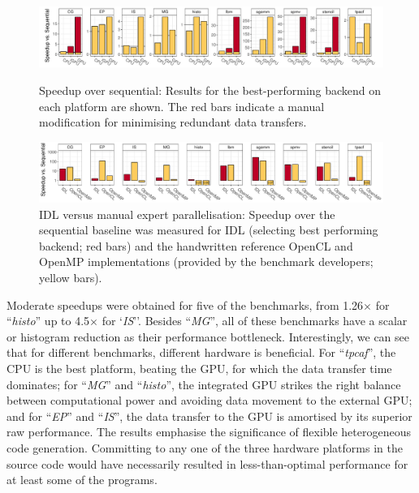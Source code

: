 \begin{figure}[t]
  \centering
  \includegraphics[width=\textwidth]{figures/asplosplots/speedup_vs_sequential_wide.pdf}
  \caption{Speedup over sequential:
           Results for the best-performing backend on each platform are shown.
           The red bars indicate a manual modification for minimising redundant
           data transfers.}
  \label{fig:speedup-figure}
  \vspace{1.5em}
  \centering
  \includegraphics[width=\textwidth]{figures/asplosplots/comparison.pdf}
  \caption{IDL versus manual expert parallelisation:
           Speedup over the sequential baseline was measured for IDL
           (selecting best performing backend; red bars) and the
           handwritten reference OpenCL and OpenMP implementations
           (provided by the benchmark developers; yellow bars).}
  \label{fig:speedup-figure-2}
  \vspace{0.5em}
\end{figure}

    Moderate speedups were obtained for five of the benchmarks, from
    1.26$\times$ for ``\emph{histo}'' up to 4.5$\times$ for `\emph{IS}''.
    Besides ``\emph{MG}'', all of these benchmarks have a scalar or histogram
    reduction as their performance bottleneck.
    Interestingly, we can see that for different benchmarks, different hardware
    is beneficial.
    For ``\emph{tpcaf}'', the CPU is the best platform, beating the GPU,
    for which the data transfer time dominates;
    for ``\emph{MG}'' and ``\emph{histo}'', the integrated GPU strikes the right
    balance between computational power and avoiding data movement to the
    external GPU;
    and for ``\emph{EP}'' and ``\emph{IS}'', the data transfer to the GPU is
    amortised by its superior raw performance.
    The results emphasise the significance of flexible heterogeneous
    code generation.
    Committing to any one of the three hardware platforms in the source code
    would have necessarily resulted in less-than-optimal performance for at
    least some of the programs.

